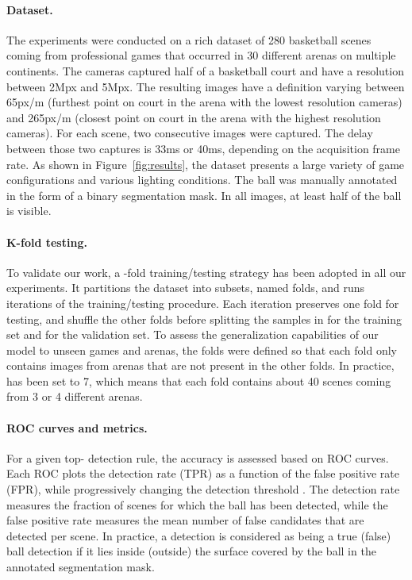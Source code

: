 \documentclass[sigconf, screen]{acmart}
\begin{document}
\paragraph{Dataset.}
\label{sec:dataset}
The experiments were conducted on a rich dataset of 280 basketball scenes coming from professional games that occurred in 30 different arenas on multiple continents. The cameras captured half of a basketball court and have a resolution between 2Mpx and 5Mpx. The resulting images have a definition varying between 65px/m (furthest point on court in the arena with the lowest resolution cameras) and 265px/m (closest point on court in the arena with the highest resolution cameras). For each scene, two consecutive images were captured. The delay between those two captures is 33ms or 40ms, depending on the acquisition frame rate. As shown in Figure~\ref{fig:results}, the dataset presents a large variety of game configurations and various lighting conditions. The ball was manually annotated in the form of a binary segmentation mask. In all images, at least half of the ball is visible.

\paragraph{K-fold testing.}
To validate our work, a -fold training/testing strategy has been adopted in all our experiments. It partitions the dataset into  subsets, named folds, and runs  iterations of the training/testing procedure. Each iteration preserves one fold for testing, and shuffle the other folds before splitting the samples in  for the training set and  for the validation set.
To assess the generalization capabilities of our model to unseen games and arenas, the  folds were defined so that each fold only contains images from arenas that are not present in the other folds.
In practice,  has been set to 7, which means that each fold contains about 40 scenes coming from 3 or 4 different arenas.

\paragraph{ROC curves and metrics.}
For a given top- detection rule, the accuracy is assessed based on ROC curves. Each ROC plots the detection rate (TPR) as a function of the false positive rate (FPR), while progressively changing the detection threshold . The detection rate measures the fraction of scenes for which the ball has been detected, while the false positive rate measures the mean number of false candidates that are detected per scene. In practice, a detection is considered as being a true (false) ball detection if it lies inside (outside) the surface covered by the ball in the annotated segmentation mask.
\end{document}

